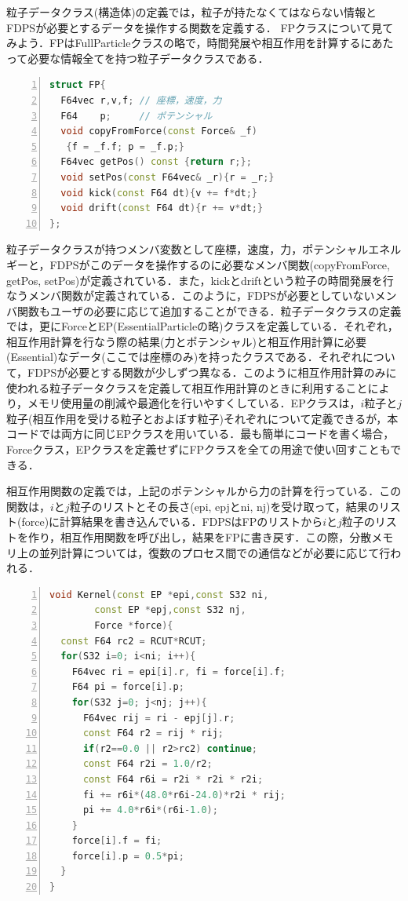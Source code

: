 \documentclass{jspf}            %
\begin{document}
  粒子データクラス(構造体)の定義では，粒子が持たなくてはならない情報とFDPSが必要とするデータを操作する関数を定義する．
FPクラスについて見てみよう．FPはFullParticleクラスの略で，時間発展や相互作用を計算するにあたって必要な情報全てを持つ粒子データクラスである．
\begin{lstlisting}[language=c++,numbers=left,numbersep=5pt,frame=single,basicstyle=\footnotesize]
struct FP{
  F64vec r,v,f; // 座標，速度，力
  F64    p;     // ポテンシャル
  void copyFromForce(const Force& _f)
   {f = _f.f; p = _f.p;}
  F64vec getPos() const {return r;};
  void setPos(const F64vec& _r){r = _r;}
  void kick(const F64 dt){v += f*dt;}
  void drift(const F64 dt){r += v*dt;}
};
\end{lstlisting}
粒子データクラスが持つメンバ変数として座標，速度，力，ポテンシャルエネルギーと，FDPSがこのデータを操作するのに必要なメンバ関数(copyFromForce, getPos, setPos)が定義されている．また，kickとdriftという粒子の時間発展を行なうメンバ関数が定義されている．このように，FDPSが必要としていないメンバ関数もユーザの必要に応じて追加することができる．粒子データクラスの定義では，更にForceとEP(EssentialParticleの略)クラスを定義している．それぞれ，相互作用計算を行なう際の結果(力とポテンシャル)と相互作用計算に必要(Essential)なデータ(ここでは座標のみ)を持ったクラスである．それぞれについて，FDPSが必要とする関数が少しずつ異なる．このように相互作用計算のみに使われる粒子データクラスを定義して相互作用計算のときに利用することにより，メモリ使用量の削減や最適化を行いやすくしている．EPクラスは，$i$粒子と$j$粒子(相互作用を受ける粒子とおよぼす粒子)それぞれについて定義できるが，本コードでは両方に同じEPクラスを用いている．最も簡単にコードを書く場合，Forceクラス，EPクラスを定義せずにFPクラスを全ての用途で使い回すこともできる．

相互作用関数の定義では，上記のポテンシャルから力の計算を行っている．この関数は，$i$と$j$粒子のリストとその長さ(epi, epjとni, nj)を受け取って，結果のリスト(force)に計算結果を書き込んでいる．FDPSはFPのリストから$i$と$j$粒子のリストを作り，相互作用関数を呼び出し，結果をFPに書き戻す．この際，分散メモリ上の並列計算については，復数のプロセス間での通信などが必要に応じて行われる．
\begin{lstlisting}[language=c++,numbers=left,numbersep=5pt,frame=single,basicstyle=\footnotesize]
void Kernel(const EP *epi,const S32 ni,
	    const EP *epj,const S32 nj,
	    Force *force){
  const F64 rc2 = RCUT*RCUT;
  for(S32 i=0; i<ni; i++){
    F64vec ri = epi[i].r, fi = force[i].f;
    F64 pi = force[i].p;
    for(S32 j=0; j<nj; j++){
      F64vec rij = ri - epj[j].r;
      const F64 r2 = rij * rij;
      if(r2==0.0 || r2>rc2) continue;
      const F64 r2i = 1.0/r2;
      const F64 r6i = r2i * r2i * r2i;
      fi += r6i*(48.0*r6i-24.0)*r2i * rij;
      pi += 4.0*r6i*(r6i-1.0);
    }
    force[i].f = fi;
    force[i].p = 0.5*pi;
  }
}
\end{lstlisting}
\end{document}
